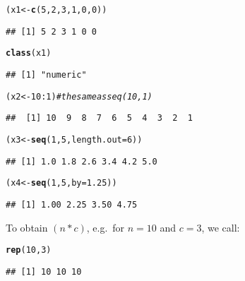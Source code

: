 \documentclass[11pt]{article}\usepackage[]{graphicx}\usepackage[]{color}
\makeatletter
\newcommand{\hlnum}[1]{\textcolor[rgb]{0.686,0.059,0.569}{#1}}%
\newcommand{\hlcom}[1]{\textcolor[rgb]{0.678,0.584,0.686}{\textit{#1}}}%
\newcommand{\hlopt}[1]{\textcolor[rgb]{0,0,0}{#1}}%
\newcommand{\hlstd}[1]{\textcolor[rgb]{0.345,0.345,0.345}{#1}}%
\newcommand{\hlkwb}[1]{\textcolor[rgb]{0.69,0.353,0.396}{#1}}%
\newcommand{\hlkwc}[1]{\textcolor[rgb]{0.333,0.667,0.333}{#1}}%
\newcommand{\hlkwd}[1]{\textcolor[rgb]{0.737,0.353,0.396}{\textbf{#1}}}%
\newenvironment{kframe}{%
 \def\at@end@of@kframe{}%
 \ifinner\ifhmode%
  \def\at@end@of@kframe{\end{minipage}}%
  \begin{minipage}{\columnwidth}%
 \fi\fi%
 \def\FrameCommand##1{\hskip\@totalleftmargin \hskip-\fboxsep
 \colorbox{shadecolor}{##1}\hskip-\fboxsep
     \hskip-\linewidth \hskip-\@totalleftmargin \hskip\columnwidth}%
 \MakeFramed {\advance\hsize-\width
   \@totalleftmargin\z@ \linewidth\hsize
   \@setminipage}}%
 {\par\unskip\endMakeFramed%
 \at@end@of@kframe}
\newenvironment{knitrout}{}{} %
\theoremstyle{remark}
\theoremstyle{definition}
\makeatother
\begin{document}
\begin{knitrout}\small
{}\color{fgcolor}\begin{kframe}
\begin{alltt}
\hlstd{(x1} \hlkwb{<-} \hlkwd{c}\hlstd{(}\hlnum{5}\hlstd{,} \hlnum{2}\hlstd{,} \hlnum{3}\hlstd{,} \hlnum{1}\hlstd{,} \hlnum{0}\hlstd{,} \hlnum{0}\hlstd{))}
\end{alltt}
\begin{verbatim}
## [1] 5 2 3 1 0 0
\end{verbatim}
\begin{alltt}
\hlkwd{class}\hlstd{(x1)}
\end{alltt}
\begin{verbatim}
## [1] "numeric"
\end{verbatim}
\begin{alltt}
\hlstd{(x2} \hlkwb{<-} \hlnum{10}\hlopt{:}\hlnum{1}\hlstd{)} \hlcom{# the same as seq(10, 1)}
\end{alltt}
\begin{verbatim}
##  [1] 10  9  8  7  6  5  4  3  2  1
\end{verbatim}
\begin{alltt}
\hlstd{(x3} \hlkwb{<-} \hlkwd{seq}\hlstd{(}\hlnum{1}\hlstd{,} \hlnum{5}\hlstd{,} \hlkwc{length.out}\hlstd{=}\hlnum{6}\hlstd{))}
\end{alltt}
\begin{verbatim}
## [1] 1.0 1.8 2.6 3.4 4.2 5.0
\end{verbatim}
\begin{alltt}
\hlstd{(x4} \hlkwb{<-} \hlkwd{seq}\hlstd{(}\hlnum{1}\hlstd{,} \hlnum{5}\hlstd{,} \hlkwc{by}\hlstd{=}\hlnum{1.25}\hlstd{))}
\end{alltt}
\begin{verbatim}
## [1] 1.00 2.25 3.50 4.75
\end{verbatim}
\end{kframe}
\end{knitrout}

To obtain $(n\ast c)$, e.g.~for $n=10$ and $c=3$, we call:

\begin{knitrout}\small
{}\color{fgcolor}\begin{kframe}
\begin{alltt}
\hlkwd{rep}\hlstd{(}\hlnum{10}\hlstd{,} \hlnum{3}\hlstd{)}
\end{alltt}
\begin{verbatim}
## [1] 10 10 10
\end{verbatim}
\end{kframe}
\end{knitrout}
\end{document}
